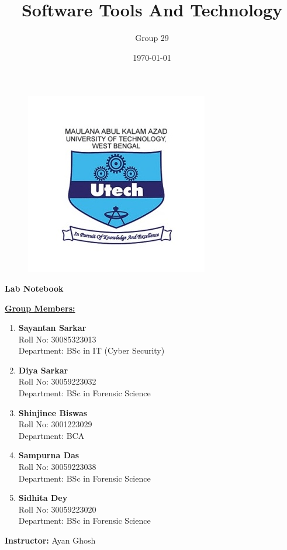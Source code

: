 \documentclass[12pt, a4paper]{article}
\title{\Huge \textbf{Software Tools And Technology}}
\author{Group 29}
\date{}
\begin{document}
\begin{figure}
    \centering
    \includegraphics[width=0.3\linewidth]{Makaut.png}
\end{figure}

\maketitle
{}


\begin{center}
    \vspace{-1.2cm}
    \LARGE\textbf{Lab Notebook}
\end{center}

\vspace{0.5cm}

\centering
\bfseries{\underline{Group Members:}}
\vspace{0.2cm}

\begin{enumerate}
    \item \textbf{Sayantan Sarkar} \\
    Roll No: 30085323013 \\
    Department: BSc in IT (Cyber Security)
    
    \item \textbf{Diya Sarkar} \\
    Roll No: 30059223032 \\
    Department: BSc in Forensic Science
    
    \item \textbf{Shinjinee Biswas} \\
    Roll No: 3001223029 \\
    Department: BCA
    
    \item \textbf{Sampurna Das} \\
    Roll No: 30059223038 \\
    Department: BSc in Forensic Science
    
    \item \textbf{Sidhita Dey} \\
    Roll No: 30059223020 \\
    Department: BSc in Forensic Science
\end{enumerate}

\vspace{0.8cm}
\textbf{Instructor:} Ayan Ghosh \\
\date{\today}
\end{document}
